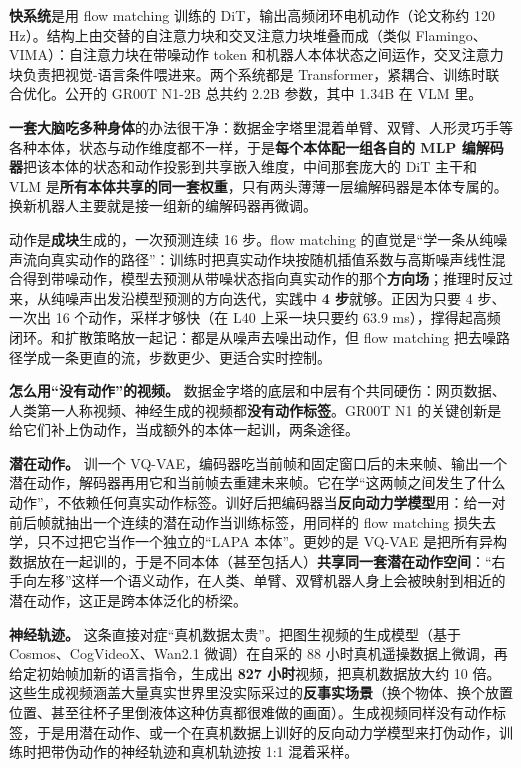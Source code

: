 \documentclass[
  chinese,
]{ctexart}
\begin{document}
\textbf{快系统}是用 flow matching 训练的
DiT，输出高频闭环电机动作（论文称约 120
Hz）。结构上由交替的自注意力块和交叉注意力块堆叠而成（类似
Flamingo、VIMA）：自注意力块在带噪动作 token
和机器人本体状态之间运作，交叉注意力块负责把视觉-语言条件喂进来。两个系统都是
Transformer，紧耦合、训练时联合优化。公开的 GR00T N1-2B 总共约 2.2B
参数，其中 1.34B 在 VLM 里。

\textbf{一套大脑吃多种身体}的办法很干净：数据金字塔里混着单臂、双臂、人形灵巧手等各种本体，状态与动作维度都不一样，于是\textbf{每个本体配一组各自的
MLP 编解码器}把该本体的状态和动作投影到共享嵌入维度，中间那套庞大的 DiT
主干和 VLM
是\textbf{所有本体共享的同一套权重}，只有两头薄薄一层编解码器是本体专属的。换新机器人主要就是接一组新的编解码器再微调。

动作是\textbf{成块}生成的，一次预测连续 16 步。flow matching
的直觉是``学一条从纯噪声流向真实动作的路径''：训练时把真实动作块按随机插值系数与高斯噪声线性混合得到带噪动作，模型去预测从带噪状态指向真实动作的那个\textbf{方向场}；推理时反过来，从纯噪声出发沿模型预测的方向迭代，实践中
\textbf{4 步}就够。正因为只要 4 步、一次出 16 个动作，采样才够快（在 L40
上采一块只要约 63.9
ms），撑得起高频闭环。和扩散策略放一起记：都是从噪声去噪出动作，但 flow
matching 把去噪路径学成一条更直的流，步数更少、更适合实时控制。

\textbf{怎么用``没有动作''的视频。}
数据金字塔的底层和中层有个共同硬伤：网页数据、人类第一人称视频、神经生成的视频都\textbf{没有动作标签}。GR00T
N1 的关键创新是给它们补上伪动作，当成额外的本体一起训，两条途径。

\textbf{潜在动作。} 训一个
VQ-VAE，编码器吃当前帧和固定窗口后的未来帧、输出一个潜在动作，解码器再用它和当前帧去重建未来帧。它在学``这两帧之间发生了什么动作''，不依赖任何真实动作标签。训好后把编码器当\textbf{反向动力学模型}用：给一对前后帧就抽出一个连续的潜在动作当训练标签，用同样的
flow matching 损失去学，只不过把它当作一个独立的``LAPA 本体''。更妙的是
VQ-VAE
是把所有异构数据放在一起训的，于是不同本体（甚至包括人）\textbf{共享同一套潜在动作空间}：``右手向左移''这样一个语义动作，在人类、单臂、双臂机器人身上会被映射到相近的潜在动作，这正是跨本体泛化的桥梁。

\textbf{神经轨迹。}
这条直接对症``真机数据太贵''。把图生视频的生成模型（基于
Cosmos、CogVideoX、Wan2.1 微调）在自采的 88
小时真机遥操数据上微调，再给定初始帧加新的语言指令，生成出 \textbf{827
小时}视频，把真机数据放大约 10
倍。这些生成视频涵盖大量真实世界里没实际采过的\textbf{反事实场景}（换个物体、换个放置位置、甚至往杯子里倒液体这种仿真都很难做的画面）。生成视频同样没有动作标签，于是用潜在动作、或一个在真机数据上训好的反向动力学模型来打伪动作，训练时把带伪动作的神经轨迹和真机轨迹按
1:1 混着采样。
\end{document}
